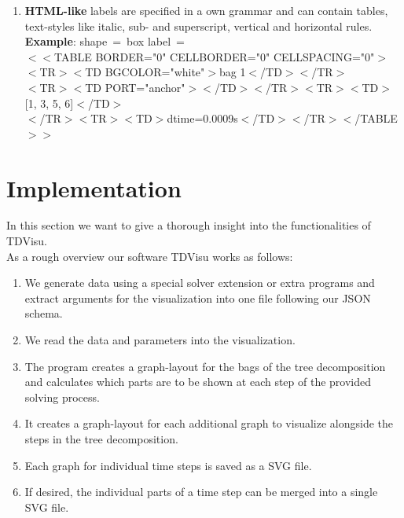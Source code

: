 \documentclass[a4paper, 12pt, bibliography=totoc]{scrartcl}
\begin{document}
\begin{itemize}
\begin{enumerate}[label=(\arabic*)]
		\item \textbf{HTML-like} labels are specified in a own grammar and can contain tables, text-styles like italic, sub- and superscript, vertical and horizontal rules.\vspace{10pt}\\		
		\textbf{Example}: shape~=~box label~=\vspace{5pt}\\
		$<<$TABLE BORDER="0" CELLBORDER="0" CELLSPACING="0"$>$\\
		$<$TR$><$TD BGCOLOR="white"$>$bag 1$<$/TD$><$/TR$>$\\
		$<$TR$><$TD PORT="anchor"$>$$<$/TD$><$/TR$><$TR$><$TD$>$[1, 3, 5, 6]$<$/TD$>$\\ $<$/TR$><$TR$><$TD$>$dtime=0.0009s$<$/TD$><$/TR$><$/TABLE$>>$
	\end{enumerate}
\end{itemize}


\newpage
\section{Implementation}\label{sec:project}

In this section we want to give a thorough insight into the functionalities of TDVisu.\\

\noindent As a rough overview our software TDVisu works as follows:

\begin{enumerate}
	\item We generate data using a special solver extension or extra programs and extract arguments for the visualization into one file following our JSON schema.
	\item We read the data and parameters into the visualization.
	\item The program creates a graph-layout for the bags of the tree decomposition and calculates which parts are to be shown at each step of the provided solving process.
	\item It creates a graph-layout for each additional graph to visualize alongside the steps in the tree decomposition.
	\item Each graph for individual time steps is saved as a SVG file.
	\item If desired, the individual parts of a time step can be merged into a single SVG file.
\end{enumerate}
\end{document}
